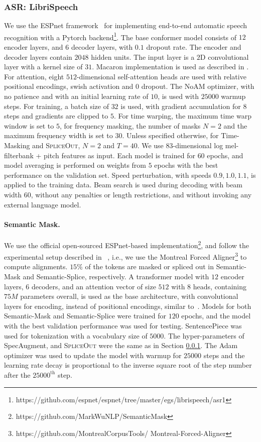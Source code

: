 \documentclass{article}
\newcommand{\SpA}{{\textsc{SpliceOut}}\xspace}
\begin{document}
\subsubsection{ASR: LibriSpeech}
\label{sec:appasr}
We use the ESPnet framework~\citep{espnet} for implementing end-to-end automatic speech recognition with a Pytorch backend\footnote{https://github.com/espnet/espnet/tree/master/egs/librispeech/asr1}. The base conformer model consists of $12$ encoder layers, and $6$ decoder layers, with $0.1$ dropout rate. The encoder and decoder layers contain $2048$ hidden units. The input layer is a $2$D convolutional layer with a kernel size of $31$. Macaron implementation is used as described in \citep{conformer,espnetconformer}. For attention, eight $512$-dimensional self-attention heads are used with relative positional encodings, swish activation and $0$ dropout. The NoAM optimizer, with no patience and with an initial learning rate of $10$, is used with $25000$ warmup steps. For training, a batch size of $32$ is used, with gradient accumulation for $8$ steps and gradients are clipped to $5$. For time warping, the maximum time warp window is set to $5$, for frequency masking, the number of masks $N=2$ and the maximum frequency width is set to $30$. Unless specified otherwise, for Time-Masking and \SpA, $N=2$ and $T=40$. We use $83$-dimensional log mel-filterbank + pitch features as input. Each model is trained for $60$ epochs, and model averaging is performed on weights from $5$ epochs with the best performance on the validation set. Speed perturbation, with speeds $0.9, 1.0, 1.1$, is applied to the training data. Beam search is used during decoding with beam width $60$, without any penalties or length restrictions, and without invoking any external language model. 

\paragraph{Semantic Mask.} We use the official open-sourced ESPnet-based  implementation\footnote{https://github.com/MarkWuNLP/SemanticMask}, and follow the experimental setup described in ~\citep{semanticmask}, i.e., we use the Montreal Forced Aligner\footnote{https://github.com/MontrealCorpusTools/
Montreal-Forced-Aligner} to compute alignments. $15\%$ of the tokens are masked or spliced out in Semantic-Mask and Semantic-Splice, respectively. A transformer model with $12$ encoder layers, $6$ decoders, and an attention vector of size $512$ with $8$ heads, containing $75M$ parameters overall, is used as the base architecture, with convolutional layers for encoding, instead of positional encodings, similar to~\citep{semanticmask}. Models for both Semantic-Mask and Semantic-Splice were trained for $120$ epochs, and the model with the best validation performance was used for testing. SentencePiece was used for tokenization with a vocabulary size of $5000$. The hyper-parameters of SpecAugment, and \SpA were the same as in Section \ref{sec:appasr}. The Adam optimizer was used to update the model with warmup for $25000$ steps and the learning rate decay is proportional to the inverse square root of the step number after the $25000^{\text{th}}$ step.
\end{document}
